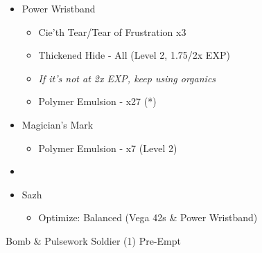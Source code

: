 \begin{paracol}{2}
\begin{upgrade}
\begin{itemize}
\begin{itemize}
\begin{itemize}
					            \item Power Wristband
					                  \begin{itemize}
						                  \item Cie'th Tear/Tear of Frustration x3
						                  \item Thickened Hide - All (Level 2, 1.75/2x EXP)
						                  \item \textit{If it's not at 2x EXP, keep using organics}
						                  \item Polymer Emulsion - x27 (*)
					                  \end{itemize}
					            \item Magician's Mark
					                  \begin{itemize}
						                  \item Polymer Emulsion - x7 (Level 2)
					                  \end{itemize}
				            \end{itemize}
			      \end{itemize}
		\end{itemize}
	\end{upgrade}
	\switchcolumn
	\begin{menu}
		\begin{itemize}
			\paradigm
			\begin{itemize}
				\item {}%
				      {\paradigmline{\com}{\rav}{}}%
				      {\paradigmline[2]{\textit{\syn}}{\textit{\sab}}{}}%
				      {\paradigmline{\com}{(\sab)}{}}%
				      {\paradigmline{\rav}{\rav}{}}%
				      {\paradigmline{[\rav]}{(\sab)}{}}%
				      {\paradigmline{[\com]}{\rav}{}}
			\end{itemize}
			\equip
			\begin{itemize}
				\item Sazh
				      \begin{itemize}
					      \item Optimize: Balanced (Vega 42s \& Power Wristband)
				      \end{itemize}
			\end{itemize}
		\end{itemize}
	\end{menu}
	\switchcolumn*
	\begin{battle}{Bomb \& Pulsework Soldier (1) Pre-Empt}

\end{battle}
\end{paracol}
